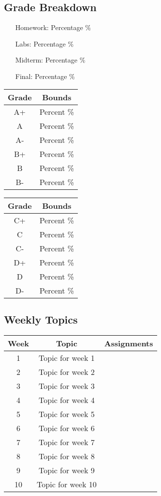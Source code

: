 \documentclass[11pt,fleqn,openany]{book} %
\begin{document}
\subsection{Grade Breakdown}
\begin{multicols}{3}
\begin{itemize}[leftmargin=1cm]
\item[Homework:]  Percentage \%
\item[Labs:] Percentage \%
\item[Midterm:] Percentage \%
\item[Final:] Percentage \%
\end{itemize}

\begin{tabular}{|c|c|} 
\hline
   Grade & Bounds  \\
\hline
  A+ & Percent \% \\ 
  A & Percent \%  \\
  A- & Percent \% \\ 
  B+ & Percent \% \\ 
  B & Percent \%  \\ 
  B- & Percent \% \\ 

\hline
\end{tabular}

\begin{tabular}{|c|c|} 
\hline
   Grade & Bounds  \\
\hline
  C+ & Percent \% \\ 
  C & Percent \%  \\
  C- & Percent \% \\ 
  D+ & Percent \% \\ 
  D & Percent \%  \\ 
  D- & Percent \% \\ 

\hline
\end{tabular}

\end{multicols}


\subsection{Weekly Topics}
\begin{center}
\begin{tabular}{ |c|c|c| } 
\hline
  Week & Topic & Assignments \\
\hline
  1 & Topic for week 1 &  \\ 
  2 & Topic for week 2 & \\ 
  3 & Topic for week 3 & \\ 
  4 & Topic for week 4 & \\ 
  5 & Topic for week 5 & \\ 
  6 & Topic for week 6 & \\ 
  7 & Topic for week 7 & \\ 
  8 & Topic for week 8 & \\ 
  9 & Topic for week 9 & \\ 
  10 & Topic for week 10 & \\
\hline
\end{tabular}
\end{center}
\end{document}
